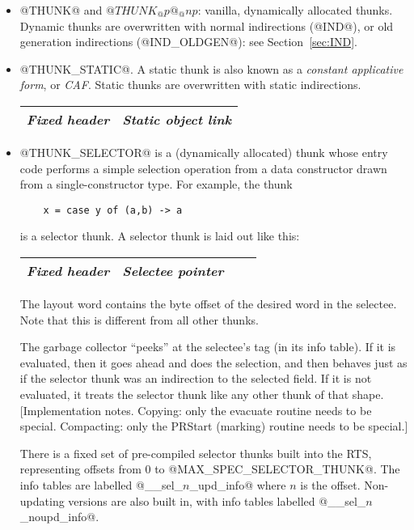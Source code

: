 \documentclass[11pt]{article}
\newcommand{\secref}[1]{Section~\ref{sec:#1}}
\begin{document}
\begin{itemize}

\item @THUNK@ and $@THUNK_@p@_@np$: vanilla, dynamically allocated
thunks.  Dynamic thunks are overwritten with normal indirections
(@IND@), or old generation indirections (@IND_OLDGEN@): see
\secref{IND}.

\item @THUNK_STATIC@.  A static thunk is also known as a
\emph{constant applicative form}, or \emph{CAF}.  Static thunks are
overwritten with static indirections.

\begin{center}
\begin{tabular}{|l|l|}\hline
\emph{Fixed header}  & \emph{Static object link}\\ \hline
\end{tabular}
\end{center}

\item @THUNK_SELECTOR@ is a (dynamically allocated) thunk whose entry
code performs a simple selection operation from a data constructor
drawn from a single-constructor type.  For example, the thunk
\begin{verbatim}
	x = case y of (a,b) -> a
\end{verbatim}
is a selector thunk.  A selector thunk is laid out like this:

\begin{center}
\begin{tabular}{|l|l|l|l|}\hline
\emph{Fixed header}  & \emph{Selectee pointer} \\ \hline
\end{tabular}
\end{center}

The layout word contains the byte offset of the desired word in the
selectee.  Note that this is different from all other thunks.

The garbage collector ``peeks'' at the selectee's tag (in its info
table).  If it is evaluated, then it goes ahead and does the
selection, and then behaves just as if the selector thunk was an
indirection to the selected field.  If it is not evaluated, it treats
the selector thunk like any other thunk of that shape.
[Implementation notes.  Copying: only the evacuate routine needs to be
special.  Compacting: only the PRStart (marking) routine needs to be
special.]

There is a fixed set of pre-compiled selector thunks built into the
RTS, representing offsets from 0 to @MAX_SPEC_SELECTOR_THUNK@.  The
info tables are labelled @__sel_$n$_upd_info@ where $n$ is the offset.
Non-updating versions are also built in, with info tables labelled
@__sel_$n$_noupd_info@.

\end{itemize}
\end{document}
